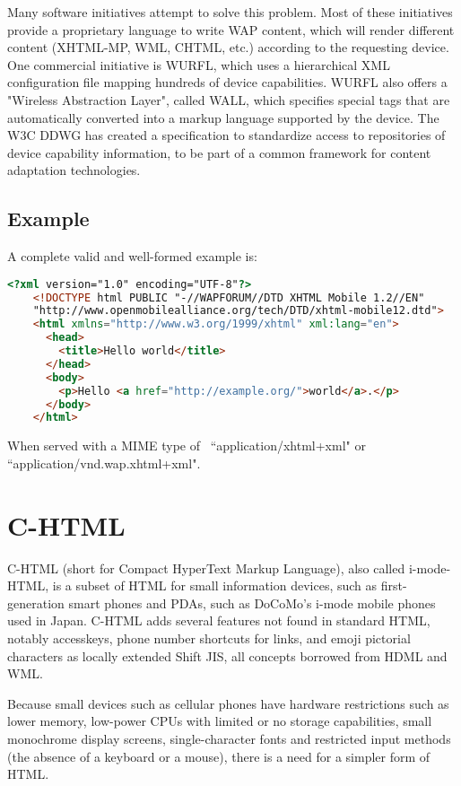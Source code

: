 Many software initiatives attempt to solve this problem. Most of these initiatives provide a proprietary language to write WAP content, which will render different content (XHTML-MP, WML, CHTML, etc.) according to the requesting device. One commercial initiative is WURFL, which uses a hierarchical XML configuration file mapping hundreds of device capabilities. WURFL also offers a "Wireless Abstraction Layer", called WALL, which specifies special tags that are automatically converted into a markup language supported by the device. The W3C DDWG has created a specification to standardize access to repositories of device capability information, to be part of a common framework for content adaptation technologies.


\section{Example}


A complete valid and well-formed example is:

\begin{lstlisting}[language=HTML]
	<?xml version="1.0" encoding="UTF-8"?>
	<!DOCTYPE html PUBLIC "-//WAPFORUM//DTD XHTML Mobile 1.2//EN"
	"http://www.openmobilealliance.org/tech/DTD/xhtml-mobile12.dtd">
	<html xmlns="http://www.w3.org/1999/xhtml" xml:lang="en">
	  <head>
	    <title>Hello world</title>
	  </head>
	  <body>
	    <p>Hello <a href="http://example.org/">world</a>.</p>
	  </body>
	</html>
\end{lstlisting}

When served with a MIME type of ~``application/xhtml+xml" or ``application/vnd.wap.xhtml+xml".







\chapter{C-HTML}


C-HTML (short for Compact HyperText Markup Language), also called i-mode-HTML, is a subset of HTML for small information devices, such as first-generation smart phones and PDAs, such as DoCoMo's i-mode mobile phones used in Japan. C-HTML adds several features not found in standard HTML, notably accesskeys, phone number shortcuts for links, and emoji pictorial characters as locally extended Shift JIS, all concepts borrowed from HDML and WML.


Because small devices such as cellular phones have hardware restrictions such as lower memory, low-power CPUs with limited or no storage capabilities, small monochrome display screens, single-character fonts and restricted input methods (the absence of a keyboard or a mouse), there is a need for a simpler form of HTML.

